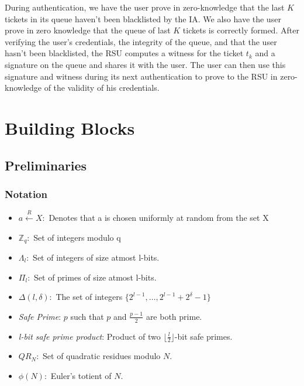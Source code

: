 \documentclass[12pt]{article}
\newcommand{\rIn}{\xleftarrow{R}}
\begin{document}
\par During authentication, we have the user prove in zero-knowledge that the last $K$ tickets in its queue haven't been blacklisted by the IA. We also have the user prove in zero knowledge that the queue of last $K$ tickets is correctly formed. After verifying the user's credentials, the integrity of the queue, and that the user hasn't been blacklisted, the RSU computes a witness for the ticket $t_k$ and a signature on the queue and shares it with the user. The user can then use this signature and witness during its next authentication to prove to the RSU in zero-knowledge of the validity of his credentials.



\section{Building Blocks}
\subsection{Preliminaries}
\subsubsection*{Notation}
\begin{itemize}
	\item $a \rIn X :$ Denotes that a is chosen uniformly at random from the set X
	\item $\mathbb{Z}_q :$ Set of integers modulo q
	\item $\Lambda_l :$ Set of integers of size atmost l-bits.
	\item $\Pi_l :$ Set of primes of size atmost l-bits.
	\item $\Delta(l, \delta) :$ The set of integers $\{2^{l-1}, \dots , 2^{l-1}+2^{\delta}-1 \}$ 
	\item \textit{Safe Prime}: $p$ such that $p$ and $\frac{p-1}{2}$ are both prime.
	\item \textit{l-bit safe prime product}: Product of two $\lfloor\frac{l}{2}\rfloor$-bit safe primes.
	\item $QR_N :$ Set of quadratic residues modulo $N$.
	\item $\phi(N) :$ Euler's totient of $N$.
\end{itemize}
\end{document}
